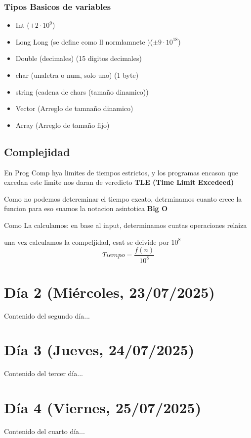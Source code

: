 \documentclass[11pt]{article}
\begin{document}

\subsubsection{Tipos Basicos de variables}
\begin{itemize}
    \item Int ($\pm 2 \cdot 10^9$)
    \item Long Long (se define como ll normlamnete )($\pm 9 \cdot 10^18$)
    \item Double (decimales) (15 digitos decimales)
    \item char (unaletra o num, solo uno) (1 byte)
    \item string (cadena de chars (tamaño dinamico))
    \item Vector (Arreglo de tamnaño dinamico)
    \item Array (Arreglo de tamaño fijo)
\end{itemize}



\subsection{Complejidad}
En Prog Comp hya limites de tiempos estrictos, y los programas encason que excedan este limite nos daran de veredicto \textbf{TLE (Time Limit Excedeed)}

Como no podemos detereminar el tiempo excato, detrminamos cuanto crece la funcion
para eso suamos la notacion asintotica \textbf{Big O}

Como La calculamos:
en base al input, determinamos cuntas operaciones relaiza

una vez calculamos la compeljidad, esat se deivide por $10^8$ 
\[Tiempo=\frac{f(n)}{10^8} \]


\newpage


\section{Día 2 (Miércoles, 23/07/2025)}
Contenido del segundo día...

\newpage
\section{Día 3 (Jueves, 24/07/2025)}
Contenido del tercer día...

\newpage
\section{Día 4 (Viernes, 25/07/2025)}
Contenido del cuarto día...
\end{document}
